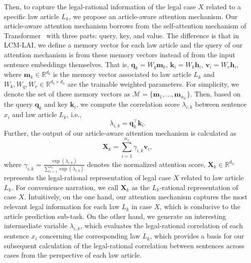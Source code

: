 Then, to capture the legal-rational information of the legal case $X$ related to a specific law article $L_k$, we propose an article-aware attention mechanism. 
Our article-aware attention mechanism borrows from the self-attention mechanism of Transformer~\cite{vaswani2017Transformer} with three parts: query, key, and value.
The difference is that in LCM-LAI, we define a memory vector for each law article and the query of our attention mechanism is from these memory vectors instead of from the input sentence embeddings themselves.
That is, $\mathbf{q}_k= W_q\mathbf{m}_k$, $\mathbf{k}_i = W_k\mathbf{h}_i$, $\mathbf{v}_i = W_v\mathbf{h}_i$,
where $\textbf{m}_k \in \mathbb{R}^{d_b}$ is the memory vector associated to law article $L_k$ and
$W_k, W_q, W_v \in \mathbb{R}^{d_b \times d_h}$ are the trainable weighted parameters.
For simplicity, we denote the set of these memory vectors as $\mathcal{M} = \{ \mathbf{m}_1, \ldots, \mathbf{m}_{n_L}\}$.
Then, based on the query $\mathbf{q}_k$ and key $\mathbf{k}_i$, we compute the correlation score $\lambda_{i, k}$ between sentence $x_i$ and law article $L_k$, i.e.,
\begin{equation} \label{eq: sub_attention}
\lambda_{i, k} = \mathbf{q}_k^{\intercal} \mathbf{k}_i.
\end{equation}
Further, the output of our article-aware attention mechanism is calculated as
\begin{equation} \label{eq: sub_attention_sum}
\mathbf{X}_k = \sum_{i=1}^{n_x}\gamma_{i,k}\mathbf{v}_i,
\end{equation}
where $\gamma_{i, k} = \frac{\exp(\lambda_{i, k})}{\sum_{i=1}^{n_x} \exp(\lambda_{i, k})}$ denotes the normalized attention score,
$\mathbf{X}_k \in \mathbb{R}^{d_h}$ represents the legal-rational representation of legal case $X$ related to law article $L_k$.
For convenience narration, we call $\mathbf{X}_k$ as the $L_k$-rational representation of case $X$.
Intuitively, on the one hand, our attention mechanism captures the most relevant legal information for each law $L_k$ in case $X$, which is conducive to the article prediction sub-task.
On the other hand, we generate an interesting intermediate variable $\lambda_{i, k}$, which evaluates the legal-rational correlation of each sentence $x_i$ concerning the corresponding law $L_k$, which provides a basis for our subsequent calculation of the legal-rational correlation between sentences across cases from the perspective of each law article.

